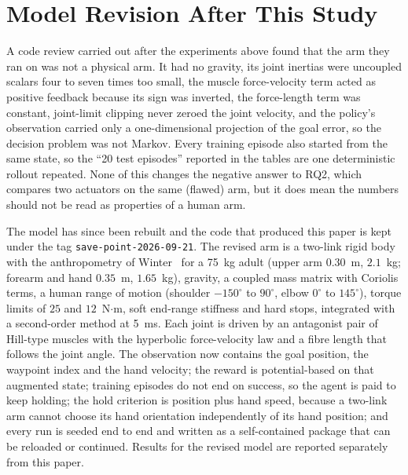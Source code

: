 \documentclass[conference]{IEEEtran}
\begin{document}
\section{Model Revision After This Study}
\label{sec:revision}

A code review carried out after the experiments above found that the arm they
ran on was not a physical arm. It had no gravity, its joint inertias were
uncoupled scalars four to seven times too small, the muscle force-velocity
term acted as positive feedback because its sign was inverted, the
force-length term was constant, joint-limit clipping never zeroed the joint
velocity, and the policy's observation carried only a one-dimensional
projection of the goal error, so the decision problem was not Markov. Every
training episode also started from the same state, so the ``20 test
episodes'' reported in the tables are one deterministic rollout repeated.
None of this changes the negative answer to RQ2, which compares two actuators
on the same (flawed) arm, but it does mean the numbers should not be read as
properties of a human arm.

The model has since been rebuilt and the code that produced this paper is
kept under the tag \texttt{save-point-2026-09-21}. The revised arm is a
two-link rigid body with the anthropometry of Winter~\cite{winter2009} for a
75~kg adult (upper arm $0.30$~m, $2.1$~kg; forearm and hand $0.35$~m,
$1.65$~kg), gravity, a coupled mass matrix with Coriolis terms, a human range
of motion (shoulder $-150^{\circ}$ to $90^{\circ}$, elbow $0^{\circ}$ to
$145^{\circ}$), torque limits of $25$ and $12$~N$\cdot$m, soft end-range
stiffness and hard stops, integrated with a second-order method at 5~ms. Each
joint is driven by an antagonist pair of Hill-type muscles with the hyperbolic
force-velocity law and a fibre length that follows the joint angle. The
observation now contains the goal position, the waypoint index and the hand
velocity; the reward is potential-based on that augmented state; training
episodes do not end on success, so the agent is paid to keep holding; the
hold criterion is position plus hand speed, because a two-link arm cannot
choose its hand orientation independently of its hand position; and every
run is seeded end to end and written as a self-contained package that can be
reloaded or continued. Results for the revised model are reported separately
from this paper.

\FloatBarrier
\end{document}
